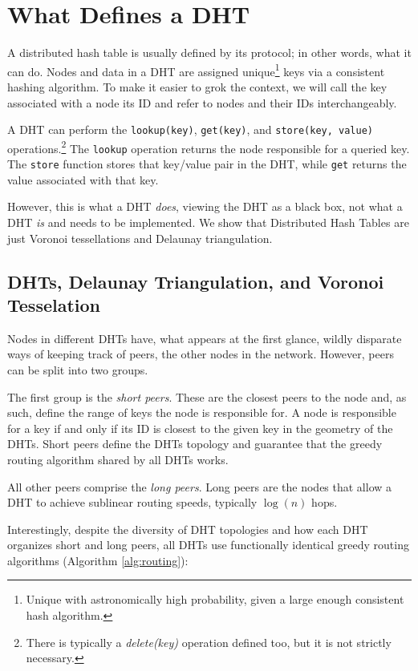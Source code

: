 \documentclass[11pt,conference]{IEEEtran}
\begin{document}
\section{What Defines a DHT}
\label{sec:define}

A distributed hash table is usually defined by its protocol; in other words, what it can do.
Nodes and data in a DHT are assigned unique\footnote{Unique with astronomically high probability, given a large enough consistent hash algorithm.} keys via a consistent hashing algorithm.
To make it easier to grok the context, we will call the key associated with a node its ID and refer to nodes and their IDs interchangeably.

A DHT can perform the \texttt{lookup(key)}, \texttt{get(key)}, and \texttt{store(key, value)} operations.\footnote{There is typically a \textit{delete(key)} operation defined too, but it is not strictly necessary.}
The \texttt{lookup} operation returns the node responsible for a queried key.
The \texttt{store} function stores that key/value pair in the DHT, while \texttt{get} returns the value associated with that key.

However, this is what a DHT \textit{does}, viewing the DHT as a black box, not what a DHT \textit{is} and needs to be implemented.
We show that Distributed Hash Tables are just Voronoi tessellations and Delaunay triangulation.

\subsection{DHTs, Delaunay Triangulation, and Voronoi Tesselation}

Nodes in different DHTs have, what appears at the first glance, wildly disparate ways of keeping track of peers, the other nodes in the network.
However, peers can be split into two groups.

The first group is the \textit{short peers}.
These are the closest peers to the node and, as such, define the range of keys the node is responsible for. 
A node is responsible for a key if and only if its ID is closest to the given key in the geometry of the DHTs.
Short peers define the DHTs topology and guarantee that the greedy routing algorithm shared by all DHTs works.


All other peers comprise the \textit{long peers}.
Long peers are the nodes that allow a DHT to achieve sublinear routing speeds, typically $ \log(n) $ hops.

Interestingly, despite the diversity of DHT topologies and how each DHT organizes short and long peers,  all DHTs use functionally identical greedy routing algorithms (Algorithm \ref{alg:routing}):
\end{document}
